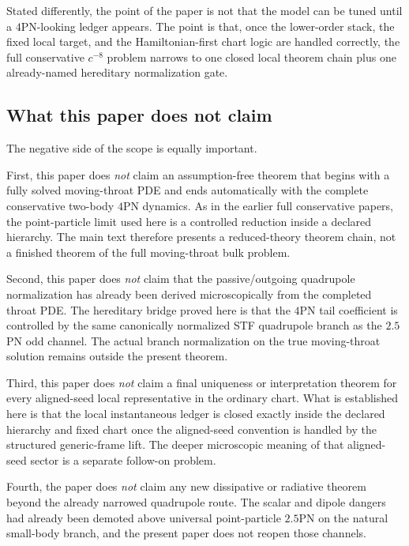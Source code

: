 \documentclass[11pt]{article}
\begin{document}
Stated differently, the point of the paper is not that the model can be tuned
until a $4$PN-looking ledger appears.  The point is that, once the lower-order
stack, the fixed local target, and the Hamiltonian-first chart logic are handled
correctly, the full conservative $c^{-8}$ problem narrows to one closed local
theorem chain plus one already-named hereditary normalization gate.

\subsection{What this paper does not claim}
\label{sec:intro-nonclaims}

The negative side of the scope is equally important.

First, this paper does \emph{not} claim an assumption-free theorem that begins
with a fully solved moving-throat PDE and ends automatically with the complete
conservative two-body $4$PN dynamics.  As in the earlier full conservative
papers, the point-particle limit used here is a controlled reduction inside a
declared hierarchy.  The main text therefore presents a reduced-theory theorem
chain, not a finished theorem of the full moving-throat bulk problem.

Second, this paper does \emph{not} claim that the passive/outgoing quadrupole
normalization has already been derived microscopically from the completed throat
PDE.  The hereditary bridge proved here is that the $4$PN tail coefficient is
controlled by the same canonically normalized STF quadrupole branch as the
$2.5$PN odd channel.  The actual branch normalization on the true moving-throat
solution remains outside the present theorem.

Third, this paper does \emph{not} claim a final uniqueness or interpretation
theorem for every aligned-seed local representative in the ordinary chart.  What
is established here is that the local instantaneous ledger is closed exactly
inside the declared hierarchy and fixed chart once the aligned-seed convention is
handled by the structured generic-frame lift.  The deeper microscopic meaning of
that aligned-seed sector is a separate follow-on problem.

Fourth, the paper does \emph{not} claim any new dissipative or radiative theorem
beyond the already narrowed quadrupole route.  The scalar and dipole dangers had
already been demoted above universal point-particle $2.5$PN on the natural
small-body branch, and the present paper does not reopen those channels.
\end{document}
